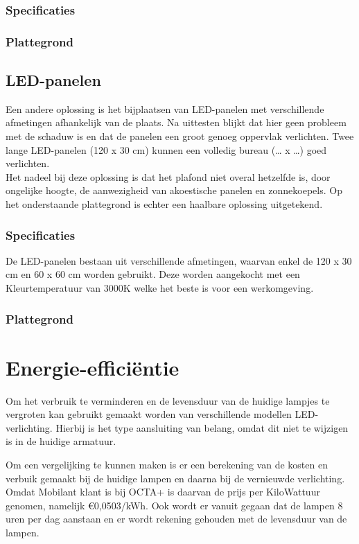 \documentclass[a4paper,12pt]{article}
\begin{document}
	\subsubsection{Specificaties}
	
	\subsubsection{Plattegrond}
	
	\subsection{LED-panelen}
	Een andere oplossing is het bijplaatsen van LED-panelen met verschillende afmetingen afhankelijk van de plaats. Na uittesten blijkt dat hier geen probleem met de schaduw is en dat de panelen een groot genoeg oppervlak verlichten. Twee lange LED-panelen (120 x 30 cm) kunnen een volledig bureau (… x …) goed verlichten.\\
	
	Het nadeel bij deze oplossing is dat het plafond niet overal hetzelfde is, door ongelijke hoogte, de aanwezigheid van akoestische panelen en zonnekoepels. Op het onderstaande plattegrond is echter een haalbare oplossing uitgetekend.
	\subsubsection{Specificaties}
	
	De LED-panelen bestaan uit verschillende afmetingen, waarvan enkel de 120 x 30 cm en 60 x 60 cm worden gebruikt. Deze worden aangekocht met een Kleurtemperatuur van 3000K welke het beste is voor een werkomgeving.
	\subsubsection{Plattegrond}
	
	\section{Energie-effici\"{e}ntie}
	Om het verbruik te verminderen en de levensduur van de huidige lampjes te vergroten kan gebruikt gemaakt worden van verschillende modellen LED-verlichting. Hierbij is het type aansluiting van belang, omdat dit niet te wijzigen is in de huidige armatuur.
	
	Om een vergelijking te kunnen maken is er een berekening van de kosten en verbuik gemaakt bij de huidige lampen en daarna bij de vernieuwde verlichting. Omdat Mobilant klant is bij OCTA+ is daarvan de prijs per KiloWattuur genomen, namelijk €0,0503/kWh. Ook wordt er vanuit gegaan dat de lampen 8 uren per dag aanstaan en er wordt rekening gehouden met de levensduur van de lampen.
	
\end{document}
